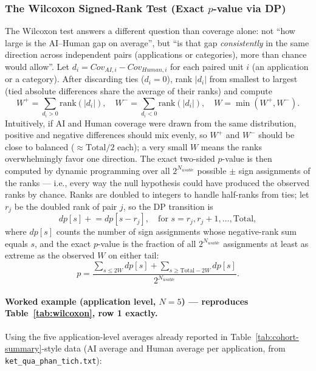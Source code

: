 \documentclass[12pt,a4paper]{article}
\begin{document}
\subsubsection*{The Wilcoxon Signed-Rank Test (Exact $p$-value via DP)}
The Wilcoxon test answers a different question than coverage alone: not ``how large is the AI--Human gap on average'', but ``is that gap \emph{consistently} in the same direction across independent pairs (applications or categories), more than chance would allow''. Let $d_i = Cov_{AI,i} - Cov_{Human,i}$ for each paired unit $i$ (an application or a category). After discarding ties ($d_i = 0$), rank $|d_i|$ from smallest to largest (tied absolute differences share the average of their ranks) and compute
\begin{equation}
    W^+ = \sum_{d_i > 0} \text{rank}(|d_i|), \quad W^- = \sum_{d_i < 0} \text{rank}(|d_i|), \quad W = \min(W^+, W^-).
\end{equation}
Intuitively, if AI and Human coverage were drawn from the same distribution, positive and negative differences should mix evenly, so $W^+$ and $W^-$ should be close to balanced ($\approx \text{Total}/2$ each); a very small $W$ means the ranks overwhelmingly favor one direction. The exact two-sided $p$-value is then computed by dynamic programming over all $2^{N_{usable}}$ possible $\pm$ sign assignments of the ranks --- i.e., every way the null hypothesis could have produced the observed ranks by chance. Ranks are doubled to integers to handle half-ranks from ties; let $r_j$ be the doubled rank of pair $j$, so the DP transition is
\begin{equation}
    dp[s] \mathrel{+}= dp[s - r_j], \quad \text{for } s = r_j, r_j+1, \ldots, \text{Total},
\end{equation}
where $dp[s]$ counts the number of sign assignments whose negative-rank sum equals $s$, and the exact $p$-value is the fraction of all $2^{N_{usable}}$ assignments at least as extreme as the observed $W$ on either tail:
\begin{equation}
    p = \frac{\displaystyle\sum_{s \le 2W} dp[s] + \sum_{s \ge \text{Total} - 2W} dp[s]}{2^{N_{usable}}}.
\end{equation}

\paragraph{Worked example (application level, $N=5$) --- reproduces Table~\ref{tab:wilcoxon}, row 1 exactly.} Using the five application-level averages already reported in Table~\ref{tab:cohort-summary}-style data (AI average and Human average per application, from \texttt{ket\_qua\_phan\_tich.txt}):
\end{document}
